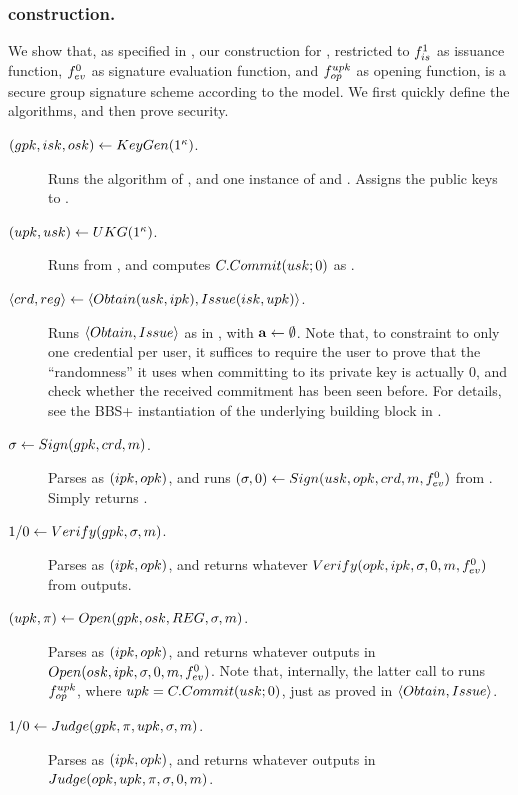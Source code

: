 \subsubsection{\CUASGS construction.} %
We show that, as specified in , our \CUASGen
construction for \UAS, restricted to $f_{is}^1$ as issuance function,
$f_{ev}^0$ as signature evaluation function, and $f_{op}^{upk}$ as opening
function, is a secure group signature scheme according to the \cite{bsz05}
model. We first quickly define the algorithms, and then prove security.

\begin{description}
\item[$(gpk,isk,osk) \gets KeyGen(1^\kappa)$.] Runs the \Setup algorithm
  of \CUASGen, and one instance of \IKeyGen and \OKeyGen. Assigns the public
  keys to \gpk.
\item[$(upk,usk) \gets UKG(1^\kappa)$.] Runs \UKeyGen from \CUASGen, and
  computes $C.Commit(usk;0)$ as \upk.
\item[$\langle crd,reg \rangle \gets
  \langle Obtain(usk,ipk),Issue(isk,upk)\rangle$.] Runs $\langle Obtain,
  Issue\rangle$ as in \CUASGen, with $\mathbf{a} \gets \emptyset$. Note that, to
  constraint to only one credential per user, it suffices to require the user
  to prove that the ``randomness'' it uses when committing to its private key
  is actually $0$, and check whether the received commitment has been seen
  before. For details, see the BBS+ instantiation of the underlying \SBCM
  building block in .
\item[$\sigma \gets Sign(gpk,crd,m)$.] Parses \gpk as $(ipk,opk)$, and
  runs $(\sigma,0) \gets Sign(usk,opk,crd,m,f_{ev}^0)$ from \CUASGen.
  Simply returns \sig.
\item[$1/0 \gets Verify(gpk,\sigma,m)$.] Parses \gpk as $(ipk,opk)$, and
  returns whatever $Verify(opk,ipk,\sigma,0,m,f_{ev}^0)$ from \CUASGen
  outputs.
\item[$(\upk,\pi) \gets \Open(\gpk,\osk,\trans,\sig,\msg)$.] Parses \gpk as
  $(ipk,opk)$, and returns whatever \CUASGen outputs in $Open(osk,ipk,\sigma,
  0,m,f_{ev}^0)$. Note that, internally, the latter call to \Open runs
  $f_{op}^{upk}$, where $upk = C.Commit(usk;0)$, just as proved in $\langle
  Obtain,Issue\rangle$.
\item[$1/0 \gets Judge(gpk,\pi,upk,\sigma,m)$.] Parses \gpk as $(ipk,
  opk)$, and returns whatever \CUASGen outputs in $Judge(opk,upk,\pi,\sigma,
  0,m)$.
\end{description}

